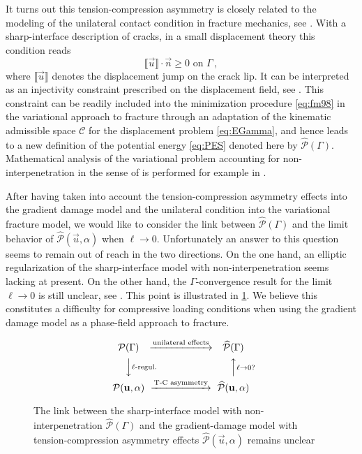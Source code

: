 It turns out this tension-compression asymmetry is closely related to the modeling of the unilateral contact condition in fracture mechanics, see \cite{AmorMarigoMaurini:2009}. With a sharp-interface description of cracks, in a small displacement theory this condition reads
\[
\llbracket\vec{u}\rrbracket\cdot\vec{n}\geq 0\text{ on $\Gamma$}\,,
\]
where $\llbracket\vec{u}\rrbracket$ denotes the displacement jump on the crack lip. It can be interpreted as an injectivity constraint prescribed on the displacement field, see \cite{CiarletNecas:1987}. This constraint can be readily included into the minimization procedure \eqref{eq:fm98} in the variational approach to fracture through an adaptation of the kinematic admissible space $\mathcal{C}$ for the displacement problem \eqref{eq:EGamma}, and hence leads to a new definition of the potential energy \eqref{eq:PES} denoted here by $\widehat{\mathcal{P}}(\Gamma)$. Mathematical analysis of the variational problem accounting for non-interpenetration in the sense of \cite{CiarletNecas:1987} is performed for example in \cite{MasoLazzaroni:2010}.

After having taken into account the tension-compression asymmetry effects into the gradient damage model and the unilateral condition into the variational fracture model, we would like to consider the link between $\widehat{\mathcal{P}}(\Gamma)$ and the limit behavior of $\widehat{\mathcal{P}}(\vec{u},\alpha)$ when $\ell\to 0$. Unfortunately an answer to this question seems to remain out of reach in  the two directions. On the one hand, an elliptic regularization of the sharp-interface model with non-interpenetration seems lacking at present. On the other hand, the $\Gamma$-convergence result for the limit $\ell\to 0$ is still unclear, see \cite{AmorMarigoMaurini:2009,FreddiRoyer-Carfagni:2010}. This point is illustrated in \cref{fig:TCunilateral}. We believe this constitutes a difficulty for compressive loading conditions when using the gradient damage model as a phase-field approach to fracture.
\begin{figure}[htbp]
\centering
\[
\begin{CD}
\mathcal{P}(\Gamma) @>\text{unilateral effects}>> \widehat{\mathcal{P}}(\Gamma) \\
@VV\text{$\ell$-regul.}V @AA{\ell\to 0?}A \\
\mathcal{P}(\vec{u},\alpha) @>\text{T-C asymmetry}>> \widehat{\mathcal{P}}(\vec{u},\alpha)
\end{CD}
\]
\caption{The link between the sharp-interface model with non-interpenetration $\widehat{\mathcal{P}}(\Gamma)$ and the gradient-damage model with tension-compression asymmetry effects $\widehat{\mathcal{P}}(\vec{u},\alpha)$ remains unclear} \label{fig:TCunilateral}
\end{figure}


